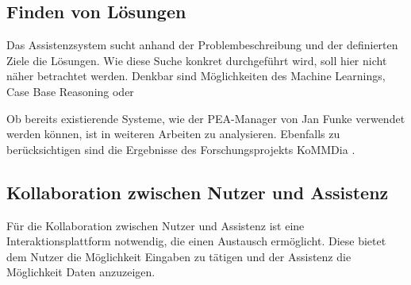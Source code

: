 \subsection{Finden von Lösungen}
Das Assistenzsystem sucht anhand der Problembeschreibung und der definierten Ziele die Lösungen. Wie diese Suche konkret durchgeführt wird, soll hier nicht näher betrachtet werden. Denkbar sind Möglichkeiten des Machine Learnings, Case Base Reasoning oder  

Ob bereits existierende Systeme, wie der PEA-Manager von Jan Funke \cite{Funke2018} verwendet werden können, ist in weiteren Arbeiten zu analysieren. Ebenfalls zu berücksichtigen sind die Ergebnisse des Forschungsprojekts KoMMDia \cite{}.

\subsection{Kollaboration zwischen Nutzer und Assistenz}
\label{4:Kollaboration}
Für die Kollaboration zwischen Nutzer und Assistenz ist eine Interaktionsplattform notwendig, die einen Austausch ermöglicht. Diese bietet dem Nutzer die Möglichkeit Eingaben zu tätigen und der Assistenz die Möglichkeit Daten anzuzeigen.

